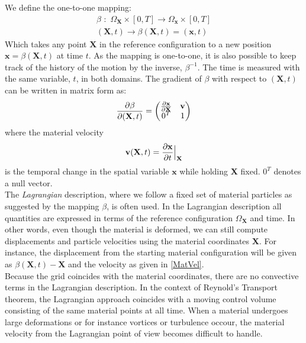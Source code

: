We define the one-to-one mapping:
\begin{align}
\beta \,\, : \,\, \Omega_{\mathbf{X}} \times [0,T] \rightarrow  \Omega_{\mathbf{x}} \times [0,T] \\
(\mathbf{X},t) \rightarrow \beta(\mathbf{X},t) = (\mathbf{x},t)
\end{align}
Which takes any point $\mathbf{X}$ in the reference configuration to a new position $\mathbf{x} = \beta(\mathbf{X},t)$ at time $t$. As the mapping is one-to-one, it is also possible to keep track of the history of the motion by the inverse, $\beta^{-1}$. The time is measured with the same variable, $t$, in both domains. The gradient of $\beta$ with respect to $(\mathbf{X},t)$ can be written in matrix form as:
\begin{align}
\frac{\partial \beta}{\partial (\mathbf{X},t)} = \begin{pmatrix} \frac{\partial \mathbf{x}}{\partial \mathbf{X}} & \mathbf{v} \\
											0^T & 1
								\end{pmatrix} \label{betaGradient}
\end{align}
where the material velocity
\begin{align} \mathbf{v}(\mathbf{X},t) = \frac{\partial \mathbf{x}}{\partial t}\Big{|}_{\mathbf{X}} \label{MatVel}
\end{align}
is the temporal change in the spatial variable $\mathbf{x}$ while holding \textbf{X} fixed. $0^T$ denotes a null vector. 
\\
The \textit{Lagrangian} description, where we follow a fixed set of material particles as suggested by the mapping $\beta$, is often used. In the Lagrangian description all quantities are expressed in terms of the reference configuration $\Omega_{\mathbf{X}}$ and time. In other words, even though the material is deformed, we can still compute displacements and particle velocities using the material coordinates $\mathbf{X}$. For instance, the displacement from the starting material configuration will be given as $\beta(\mathbf{X},t) - \mathbf{X}$ and the velocity as given in \eqref{MatVel}. \\ Because the grid coincides with the material coordinates, there are no convective terms in the Lagrangian description. In the context of Reynold's Transport theorem, the Lagrangian approach coincides with a moving control volume consisting of the same material points at all time. When a material undergoes large deformations or for instance vortices or turbulence occour, the material velocity from the Lagrangian point of view becomes difficult to handle. 
